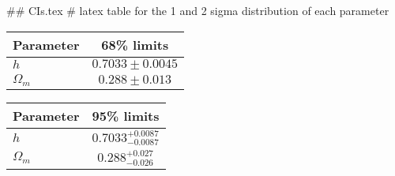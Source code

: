 ## CIs.tex
# latex table for the 1 and 2 sigma distribution of each parameter

\begin{tabular} { l  c}
 Parameter &  68\% limits\\
\hline
{\boldmath$h              $} & $0.7033\pm 0.0045          $\\
{\boldmath$\Omega_m       $} & $0.288\pm 0.013            $\\
\hline
\end{tabular}

\begin{tabular} { l  c}
 Parameter &  95\% limits\\
\hline
{\boldmath$h              $} & $0.7033^{+0.0087}_{-0.0087}$\\
{\boldmath$\Omega_m       $} & $0.288^{+0.027}_{-0.026}   $\\
\hline
\end{tabular}
